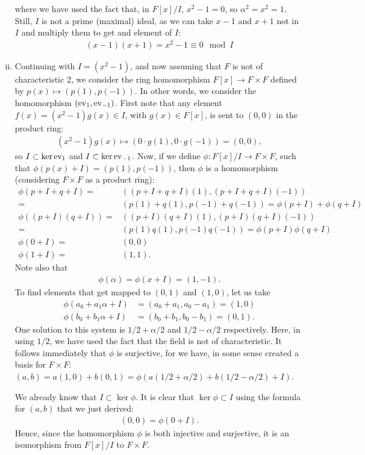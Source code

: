 \documentclass{../../mathnotes}
\begin{document}
\begin{enumerate}[(i)]
        where we have used the fact that, in $F[x]/I$, $x^2-1=0$, so $\alpha^2=x^2=1$. Still, $I$ is not a prime (maximal) ideal,
        as we can take $x-1$ and $x+1$ not in $I$ and multiply them to get and element of $I$:
        \begin{align*}
            (x-1)(x+1)=x^2-1\equiv0\mod I
        \end{align*}
    \item Continuing with $I=(x^2-1)$, and now assuming that $F$ is not of characteristic 2, we consider the ring homomorphism
        $F[x]\to F\times F$ defined by $p(x)\mapsto (p(1),p(-1))$. In other words, we consider the homomorphism $({\rm ev}_1,{\rm ev}_{-1})$.
        First note that any element $f(x)=(x^2-1)g(x)\in I$, with $g(x)\in F[x]$, is sent to $(0,0)$ in the product ring:
        \begin{align*}
            (x^2-1)g(x)\mapsto (0\cdot g(1), 0\cdot g(-1))=(0,0),
        \end{align*}
        so $I\subset\ker {\rm ev}_1$ and $I\subset\ker {\rm ev}_{-1}$. Now, if we define $\phi:F[x]/I\to F\times F$, such that
        $\phi(p(x)+I)=(p(1),p(-1))$, then $\phi$ is a homomorphism (considering $F\times F$ as a product ring):
        \begin{align*}
            \phi(p+I+q+I)=&( (p+I+q+I)(1),(p+I+q+I)(-1))\\
            =&(p(1)+q(1),p(-1)+q(-1))=\phi(p+I)+\phi(q+I)\\
            \phi( (p+I)(q+I))=&( (p+I)(q+I)(1),(p+I)(q+I)(-1) )\\
            =&( p(1)q(1),p(-1)q(-1))=\phi(p+I)\phi(q+I)\\
            \phi(0+I)=&(0,0)\\
            \phi(1+I)=&(1,1).
        \end{align*}
        Note also that
        \begin{align*}
            \phi(\alpha)=\phi(x+I)=(1,-1).
        \end{align*}
        To find elements that get mapped to $(0,1)$ and $(1,0)$, let us take
        \begin{align*}
            \phi(a_0+a_1\alpha+I)&=(a_0+a_1,a_0-a_1)=(1,0)\\
            \phi(b_0+b_1\alpha+I)&=(b_0+b_1,b_0-b_1)=(0,1).
        \end{align*}
        One solution to this system is $1/2+\alpha/2$ and $1/2-\alpha/2$ respectively. Here, in using $1/2$, we have used the fact that the field
        is not of characteristic. It follows immediately that $\phi$ is surjective, for we have, in some sense
        created a basis for $F\times F$: $(a,b)=a(1,0)+b(0,1)=\phi(a(1/2+\alpha/2)+b(1/2-\alpha/2)+I)$.

        We already know that $I\subset\ker\phi$. It is clear that $\ker\phi\subset I$ using the formula for $(a,b)$ that we just derived:
        \begin{align*}
            (0,0)=\phi(0+I).
        \end{align*}
        Hence, since the homomorphism $\phi$ is both injective and surjective, it is an isomorphism from $F[x]/I$ to $F\times F$.
\end{enumerate}
\end{document}
